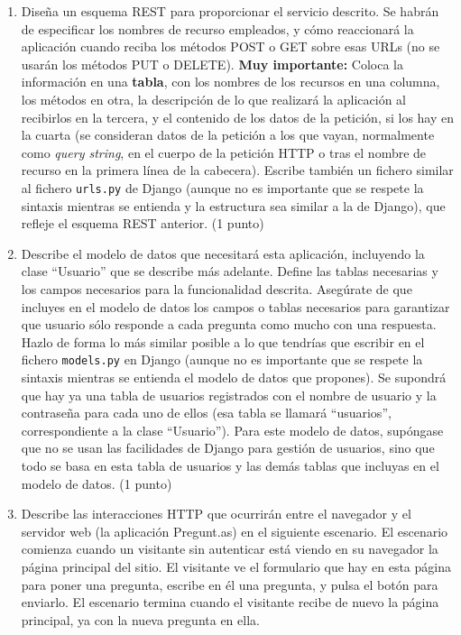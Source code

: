 \begin{enumerate}
\item Diseña un esquema REST para proporcionar el servicio descrito. Se habrán de especificar los nombres de recurso empleados, y cómo reaccionará la aplicación cuando reciba los métodos POST o GET sobre esas URLs (no se usarán los métodos PUT o DELETE). \textbf{Muy importante:} Coloca la información en una \textbf{tabla}, con los nombres de los recursos en una columna, los métodos en otra, la descripción de lo que realizará la aplicación al recibirlos en la tercera, y el contenido de los datos de la petición, si los hay en la cuarta (se consideran datos de la petición a los que vayan, normalmente como \emph{query string}, en el cuerpo de la petición HTTP o tras el nombre de recurso en la primera línea de la cabecera). Escribe también un fichero similar al fichero \texttt{urls.py} de Django (aunque no es importante que se respete la sintaxis mientras se entienda y la estructura sea similar a la de Django), que refleje el esquema REST anterior. (1 punto)

\item Describe el modelo de datos que necesitará esta aplicación, incluyendo la clase ``Usuario'' que se describe más adelante. Define las tablas necesarias y los campos necesarios para la funcionalidad descrita. Asegúrate de que incluyes en el modelo de datos los campos o tablas necesarios para garantizar que usuario sólo responde a cada pregunta como mucho con una respuesta. Hazlo de forma lo más similar posible a lo que tendrías que escribir en el fichero \texttt{models.py} en Django (aunque no es importante que se respete la sintaxis mientras se entienda el modelo de datos que propones). Se supondrá que hay ya una tabla de usuarios registrados con el nombre de usuario y la contraseña para cada uno de ellos (esa tabla se llamará ``usuarios'', correspondiente a la clase ``Usuario''). Para este modelo de datos, supóngase que no se usan las facilidades de Django para gestión de usuarios, sino que todo se basa en esta tabla de usuarios y las demás tablas que incluyas en el modelo de datos. (1 punto)
  
\item Describe las interacciones HTTP que ocurrirán entre el navegador y el servidor web (la aplicación Pregunt.as) en el siguiente escenario. El escenario comienza cuando un visitante sin autenticar está viendo en su navegador la página principal del sitio. El visitante ve el formulario que hay en esta página para poner una pregunta, escribe en él una pregunta, y pulsa el botón para enviarlo. El escenario termina cuando el visitante recibe de nuevo la página principal, ya con la nueva pregunta en ella.


\end{enumerate}
